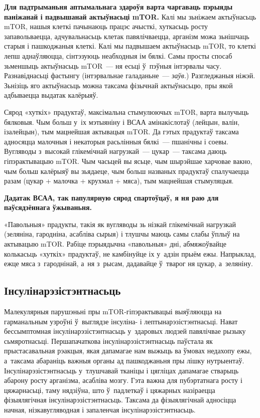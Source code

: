 \textbf{Для падтрыманьня аптымальнага здароўя варта чаргаваць пэрыяды паніжанай і падвышанай актыўнасьці mTOR.} Калі мы зьніжаем актыўнасьць mTOR, нашыя клеткі пачынаюць працэс ачысткі, хуткасьць росту запавольваецца, адчувальнасьць клетак павялічваецца, арганізм можа зьнішчаць старыя і пашкоджаныя клеткі. Калі мы падвышаем актыўнасьць mTOR, то клеткі лепш аднаўляюцца, сінтэзуюць неабходныя ім бялкі. Самы просты спосаб зьменшыць актыўнасьць mTOR~--- ня есьці ў~пэўныя інтэрвалы часу. Разнавіднасьці фастынгу (інтэрвальнае галаданьне~--- \emph{заўв.}) Разгледжаныя ніжэй. Зьнізіць яго актыўнасьць можна таксама фізычнай актыўнасьцю, пры якой адбываецца выдатак калёрыяў.

Сярод «хуткіх» прадуктаў, максімальна стымулюючых mTOR, варта вылучыць бялковыя. Чым больш у~іх мэтыяніну і ВСАА амінакіслотаў (лейцын, валін, ізалейцын), тым мацнейшая актывацыя mTOR. Да гэтых прадуктаў таксама адносяцца малочныя і некаторыя расьлінныя бялкі~--- пшанічны і соевы. Вугляводы з~высокай глікемічнай нагрузкай~--- цукар~--- таксама даюць гіпэрактывацыю mTOR. Чым часьцей вы ясьце, чым шырэйшае харчовае вакно, чым больш калёрыяў вы зьядаеце, чым больш названых прадуктаў спалучаецца разам (цукар + малочка + крухмал + мяса), тым мацнейшая стымуляцыя. 

\textbf{Дадатак ВСАА, так папулярную сярод спартоўцаў, я ня раю для паўсядзённага ўжываньня.}

«Павольныя» прадукты, такія як вугляводы зь нізкай глікемічнай нагрузкай (зеляніна, гародніна, асабліва сырыя) і тлушчы маюць самы слабы ўплыў на актывацыю mTOR. Рабіце пэрыядычна «павольныя» дні, абмяжоўвайце колькасьць «хуткіх» прадуктаў, не камбінуйце іх у~адзін прыём ежы. Напрыклад, ежце мяса з~гароднінай, а~ня з~рысам, дадавайце ў~тварог ня цукар, а~зеляніну. 


\subsection*{Інсулінарэзістэнтнасьць}

Малекулярныя парушэньні пры mTOR-гіпэрактывацыі выяўляюцца на гарманальным узроўні ў~выглядзе інсуліна- і лептынарэзістэнтнасьці. Нават бессымптомная інсулінарэзістэнтнасьць у~здаровых людзей павялічвае рызыку сьмяротнасьці. Першапачаткова інсулінарэзістэнтнасьць паўстала як прыстасавальная рэакцыя, якая дапамагае нам выжыць ва ўмовах недахопу ежы, а~таксама абараніць важныя органы ад пашкоджаньня пры лішку нутрыентаў. Інсулінарэзістэнтнасьць у~тлушчавай тканіцы і цягліцах дапамагае стварыць абарону росту арганізма, асабліва мозгу. Гэта важна для пубэртатнага росту і цяжарнасьці, таму нядзіўна, што ў~падлеткаў і цяжарных назіраецца фізыялягічная інсулінарэзістэнтнасьць. Таксама да фізыялягічнай адносіцца начная, нізкавугляводная і запаленчая інсулінарэзістэнтнасьць.

